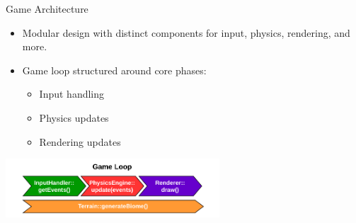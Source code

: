 \begin{frame}{Game Architecture}
    \begin{itemize}
        \item Modular design with distinct components for input, physics, rendering, and more.
        \item Game loop structured around core phases:
        \begin{itemize}
            \item Input handling
            \item Physics updates
            \item Rendering updates
        \end{itemize}
    \end{itemize}
    \centering
    \includegraphics[width=0.6\textwidth]{../figures/physics/gameLoop.pdf} %
\end{frame}